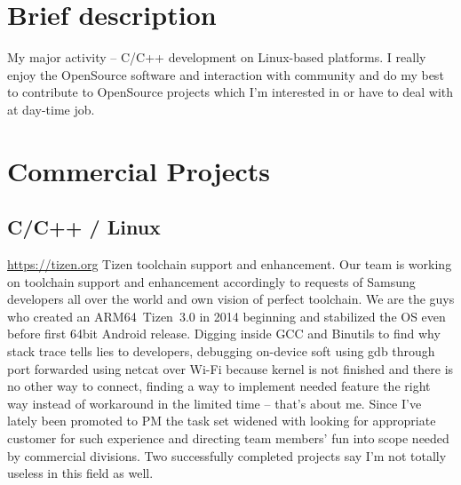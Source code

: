 \documentclass[11pt,a4paper]{moderncv}
\begin{document}
\maketitle

\section{Brief description}
\cvitem {} {My major activity -- C/C++ development on Linux-based platforms.\newline{} I really enjoy the OpenSource
  software and interaction with community and do my best to contribute to OpenSource projects which I'm interested in or
  have to deal with at day-time job.}
\section{Commercial Projects}
  \subsection{C/C++ / Linux}
  {\url{https://tizen.org}\newline{}
    Tizen toolchain support and enhancement.\newline{}
    Our team is working on toolchain support and enhancement accordingly to requests of Samsung developers all over the
    world and own vision of perfect toolchain. We are the guys who created an ARM64~Tizen~3.0 in 2014 beginning
    and stabilized the OS even before first 64bit Android release.\newline{}
    Digging inside GCC and Binutils to find why stack trace tells lies to developers, debugging on-device soft using gdb
    through port forwarded using netcat over Wi-Fi because kernel is not finished and there is no other way to connect,
    finding a way to implement needed feature the right way instead of workaround in the limited time --
    that's about me.\newline{}
    Since I've lately been promoted to PM the task set widened with looking for appropriate customer for such experience
    and directing team members' fun into scope needed by commercial divisions. Two successfully completed projects say
    I'm not totally useless in this field as well.}
\end{document}
